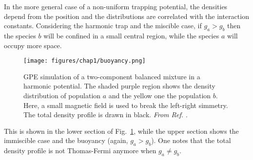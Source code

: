 In the more general case of a non-uniform trapping potential, the densities depend from the position and the distributions are correlated with the interaction constants. Considering the harmonic trap and the miscible case, if $g_a > g_b$ then the species $b$ will be confined in a small central region, while the species $a$ will occupy more space.
\begin{figure}[h!]
    \centering
    \texttt{[image: figures/chap1/buoyancy.png]}
    \caption{GPE simulation of a two-component balanced mixture in a harmonic potential. The shaded purple region shows the density distribution of population $a$ and the yellow one the population $b$. Here, a small magnetic field is used to break the left-right simmetry. The total density profile is drawn in black. \textit{From Ref. \cite{lamporesi2023two}}.} 
    \label{fig:buoy}
\end{figure}
This is shown in the lower section of Fig.\ \ref{fig:buoy}, while the upper section shows the immiscible case and the buoyancy (again, $g_a > g_b$). One notes that the total density profile is not Thomas-Fermi anymore when $g_a \neq g_b$.


